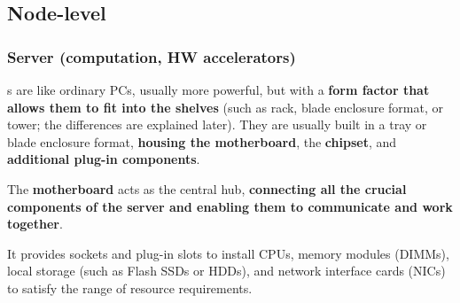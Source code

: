 \subsection{Node-level}

\subsubsection{Server (computation, HW accelerators)}\label{subsubsection: Server (computation, HW accelerators)}

s are like ordinary PCs, usually more powerful, but with a \textbf{form factor that allows them to fit into the shelves} (such as rack, blade enclosure format, or tower; the differences are explained later). They are usually built in a tray or blade enclosure format, \textbf{housing the motherboard}, the \textbf{chipset}, and \textbf{additional plug-in components}.

\highspace
The \textbf{motherboard} acts as the central hub, \textbf{connecting all the crucial components of the server and enabling them to communicate and work together}.

It provides sockets and plug-in slots to install CPUs, memory modules (DIMMs), local storage (such as Flash SSDs or HDDs), and network interface cards (NICs) to satisfy the range of resource requirements.

